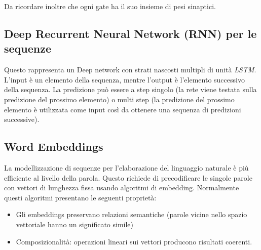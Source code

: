 Da ricordare inoltre che ogni gate ha il suo insieme di pesi sinaptici.

\subsection{Deep Recurrent Neural Network (RNN) per le sequenze}
Questo rappresenta un Deep network con strati nascosti multipli di unità \textit{LSTM}. L'input è un elemento della sequenza, mentre l'output è l'elemento successivo della sequenza. La predizione può essere a step singolo (la rete viene testata sulla predizione del prossimo elemento) o multi step (la predizione del prossimo elemento è utilizzata come input così da ottenere una sequenza di predizioni successive).

\subsection{Word Embeddings}
La modellizzazione di sequenze per l'elaborazione del linguaggio naturale è più efficiente al livello della parola. Questo richiede di precodificare le singole parole con vettori di lunghezza fissa usando algoritmi di embedding.
Normalmente questi algoritmi presentano le seguenti proprietà:
\begin{itemize}
    \item Gli embeddings preservano relazioni semantiche (parole vicine nello spazio vettoriale hanno un significato simile)
    \item Composizionalità: operazioni lineari sui vettori producono risultati coerenti.
\end{itemize}
